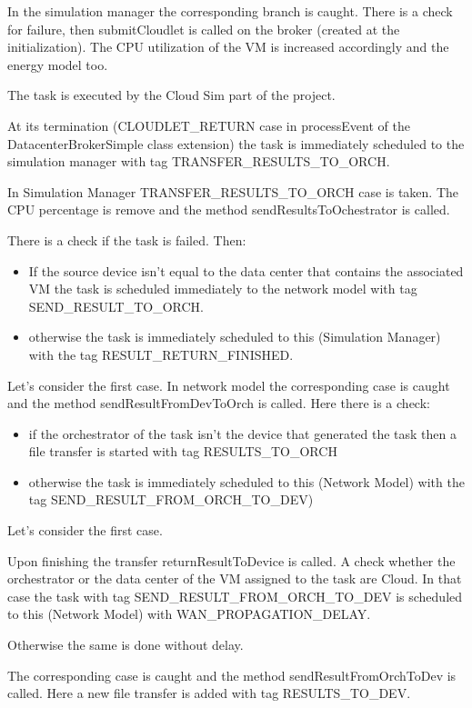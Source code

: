 \documentclass[12pt]{report}
\begin{document}
In the simulation manager the corresponding branch is caught. There is a check for failure, then submitCloudlet is called on the broker (created at the initialization). The CPU utilization of the VM is increased accordingly and the energy model too.

The task is executed by the Cloud Sim part of the project.

At its termination (CLOUDLET\_RETURN case in processEvent of the DatacenterBrokerSimple class extension) the task is immediately scheduled to the simulation manager with tag TRANSFER\_RESULTS\_TO\_ORCH.

In Simulation Manager TRANSFER\_RESULTS\_TO\_ORCH case is taken. The CPU percentage is remove and the method sendResultsToOchestrator is called.

There is a check if the task is failed. Then:
\begin{itemize}
	\item If the source device isn't equal to the data center that contains the associated VM the task is scheduled immediately to the network model with tag SEND\_RESULT\_TO\_ORCH.
	\item otherwise the task is immediately scheduled to this (Simulation Manager) with the tag RESULT\_RETURN\_FINISHED.
\end{itemize}
Let's consider the first case.
In network model the corresponding case is caught and the method sendResultFromDevToOrch is called. Here there is a check:
\begin{itemize}
	\item if the orchestrator of the task isn't the device that generated the task then a file transfer is started with tag RESULTS\_TO\_ORCH
	\item otherwise the task is immediately scheduled to this (Network Model) with the tag SEND\_RESULT\_FROM\_ORCH\_TO\_DEV)
\end{itemize}
Let's consider the first case.

Upon finishing the transfer returnResultToDevice is called.
A check whether the orchestrator or the data center of the VM assigned to the task are Cloud. In that case the task with tag SEND\_RESULT\_FROM\_ORCH\_TO\_DEV is scheduled to this (Network Model) with WAN\_PROPAGATION\_DELAY.

Otherwise the same is done without delay.

The corresponding case is caught and the method sendResultFromOrchToDev is called. Here a new file transfer is added with tag RESULTS\_TO\_DEV.
\end{document}
